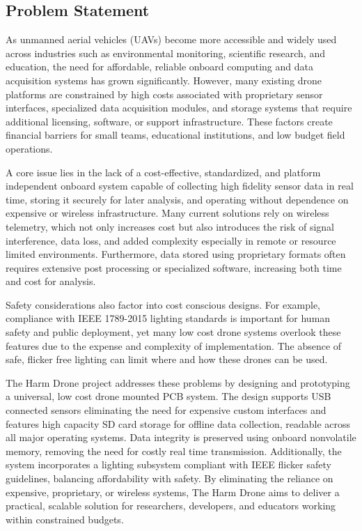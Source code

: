 \documentclass[12pt]{article}
\begin{document}
\subsection{Problem Statement}

\par As unmanned aerial vehicles (UAVs) become more accessible and widely used across industries such as environmental monitoring, scientific research, and education, the need for affordable, reliable onboard computing and data acquisition systems has grown significantly. However, many existing drone platforms are constrained by high costs associated with proprietary sensor interfaces, specialized data acquisition modules, and storage systems that require additional licensing, software, or support infrastructure. These factors create financial barriers for small teams, educational institutions, and low budget field operations.

\par A core issue lies in the lack of a cost-effective, standardized, and platform independent onboard system capable of collecting high fidelity sensor data in real time, storing it securely for later analysis, and operating without dependence on expensive or wireless infrastructure. Many current solutions rely on wireless telemetry, which not only increases cost but also introduces the risk of signal interference, data loss, and added complexity especially in remote or resource limited environments. Furthermore, data stored using proprietary formats often requires extensive post processing or specialized software, increasing both time and cost for analysis.

\par Safety considerations also factor into cost conscious designs. For example, compliance with IEEE 1789-2015 lighting standards is important for human safety and public deployment, yet many low cost drone systems overlook these features due to the expense and complexity of implementation. The absence of safe, flicker free lighting can limit where and how these drones can be used.

\par The Harm Drone project addresses these problems by designing and prototyping a universal, low cost drone mounted PCB system. The design supports USB connected sensors eliminating the need for expensive custom interfaces and features high capacity SD card storage for offline data collection, readable across all major operating systems. Data integrity is preserved using onboard nonvolatile memory, removing the need for costly real time transmission. Additionally, the system incorporates a lighting subsystem compliant with IEEE flicker safety guidelines, balancing affordability with safety. By eliminating the reliance on expensive, proprietary, or wireless systems, The Harm Drone aims to deliver a practical, scalable solution for researchers, developers, and educators working within constrained budgets.
\end{document}
